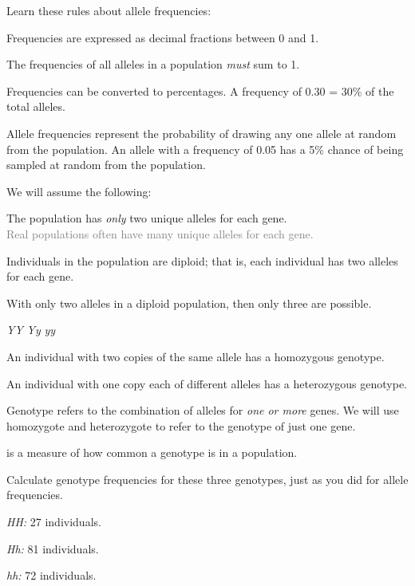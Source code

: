 \documentclass[t]{beamer}
\begin{document}
%
%
\begin{frame}[t]{Learn these rules about allele frequencies:}

	\hangpara Frequencies are expressed as decimal fractions between 0 and 1.
	
	\hangpara The frequencies of all alleles in a population \emph{must} sum to 1.
	
	\hangpara Frequencies can be converted to percentages. A frequency of 0.30 = 30\% of the total alleles.
	
	\hangpara Allele frequencies represent the probability of drawing any one allele at random from the population. An allele with a frequency of 0.05 has a 5\% chance of being sampled at random from the population.

\end{frame}
%
\begin{frame}[t]{We will assume the following:}

	\hangpara The population has \emph{only} two unique alleles for each gene.\\ \quad \textcolor{gray}{Real populations often have many unique alleles for each gene.}
	 

	\hangpara Individuals in the population are diploid; that is, each individual has two alleles for each gene.
	
\end{frame}
%
\begin{frame}[t]{With only two alleles in a diploid population, then only three  are possible.}

\Large
\hfil \alert<2>{\emph{YY}} \hfil \alert<3>{\emph{Yy}} \hfil \alert<2>{\emph{yy}} \hfill

\normalsize
	\hangpara {}An individual with two copies of the same allele has a \alert<2>{homozygous} genotype.
	
	\hangpara {}An individual with one copy each of different alleles has a \alert<3>{heterozygous} genotype.
	
	\hangpara {}\textsc{} Genotype refers to the combination of alleles for \emph{one or more} genes. We will use homozygote and heterozygote to refer to the genotype of just one gene.

\end{frame}
%
\begin{frame}[t]{ is a measure of how common a genotype is in a population.}

	\hangpara Calculate genotype frequencies for these three genotypes, just as you did for allele frequencies.
	
	\hangpara \quad \emph{HH:} 27 individuals. \onslide<2>{0.15}
	
	\hangpara \quad	\emph{Hh:} 81 individuals. \onslide<2>{0.45}
	
	\hangpara \quad \emph{hh:} 72 individuals. \onslide<2>{0.40}

\end{frame}
\end{document}
